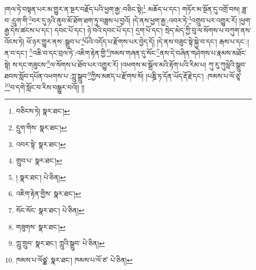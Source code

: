 །གལ་ཏེ་བསྟན་པར་མ་གྱུར་ན་སྔར་བརྗོད་པའི་ཕྱག་རྒྱ་:བཅིང་སྟེ།\footnote{བཅིངས་ཏེ།  སྣར་ཐང་། } མཆོད་པ་དང་། གཏོར་མ་སྔོན་དུ་འགྲོ་བས། ཟླ་བ་:དྲུག་གི་\footnote{དྲུག་གིས་  སྣར་ཐང་། }བར་དུ་ཉའི་ནུབ་མོ་ཐོག་ཐག་ཏུ་བཟླས་པ་བྱའོ། །དེ་ནས་ཕྱག་རྒྱ་:འབར་ཏེ་\footnote{འབར་སྟེ་  སྣར་ཐང་། }འགྲུབ་པར་འགྱུར་རོ། །ཕྱག་རྒྱ་དེས་ཚངས་པ་དང་། དབང་པོ་དང་། ཉེ་བའི་དབང་པོ་དང་། དྲག་པོ་དང་། སྲེད་མེད་ཀྱི་བུ་ལ་སོགས་པ་བཀུག་ནས་འོངས་ཏེ། ཕོ་ཉར་གྱུར་ནས་:སྒྲུབ་པ་\footnote{གྲུབ་པ་  སྣར་ཐང་། }པོའི་འདོད་པ་རྫོགས་པར་བྱེད་དོ། །དེ་ནས་བཟུང་སྟེ་སྐྱེ་བ་དང་། རྒས་པ་དང་:། ན་བ་དང་། \footnote{།    སྣར་ཐང་།  པེ་ཅིན། }འཆི་བ་དང་བྲལ་ཏེ་:འཇིག་རྟེན་གྱི་\footnote{འཇིག་རྟེན་གྱིས་  སྣར་ཐང་། }ཁམས་གཞན་དུ་སོང་\footnote{སོང་སོང་  སྣར་ཐང་།  པེ་ཅིན། }ནས་དེ་བཞིན་གཤེགས་པ་རྣམས་མཐོང་སྟེ། ས་དང་གཟུངས་\footnote{གཟུགས་  སྣར་ཐང་། }ལ་སོགས་པ་ཐོབ་པར་འགྱུར་རོ། །འཕགས་མ་སྒྲོལ་མའི་རྟོག་པའི་རིམ་པ། ཀུ་རུ་ཀུལླེའི་སྒྲུབ་ཐབས་སློབ་དཔོན་འཕགས་པ་:ཀླུ་སྒྲུབ་\footnote{ཀླུ་གྲུབ་  སྣར་ཐང་། ཀླུའི་སྒྲུབ་  པེ་ཅིན། }ཀྱིས་མཛད་པ་རྫོགས་སོ། །པཎྜི་ཏ་དོན་ཡོད་རྡོ་རྗེ་དང་། :ཁམས་པ་ལོ་ཙཱ་\footnote{ཁམས་པ་ལོཙྪ་  སྣར་ཐང་། ཁམས་པ་ལོ་ཙ་  པེ་ཅིན། }བ་དགེ་སློང་བ་རིས་བསྒྱུར་བའོ།། །།